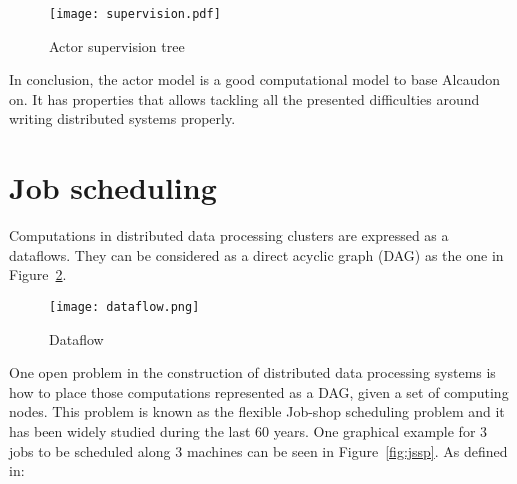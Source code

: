 \begin{figure}[!h]
\begin{center}
\texttt{[image: supervision.pdf]}
\caption{Actor supervision tree}
\label{fig:supervision}
\end{center}
\end{figure}

In conclusion, the actor model is a good computational model to base Alcaudon
on. It has properties that allows tackling all the presented difficulties around
writing distributed systems properly.

\section{Job scheduling}

Computations in distributed data processing clusters are expressed as a
dataflows. They can be considered as a direct acyclic graph (DAG) as the one in
Figure~\ref{fig:dataflow}.

\begin{figure}[h!]
\begin{center}
\texttt{[image: dataflow.png]}
\caption{Dataflow}
\label{fig:dataflow}
\end{center}
\end{figure}

One open problem in the construction of distributed data processing systems is
how to place those computations represented as a \acs{DAG}, given a set of computing
nodes. This problem is known as the flexible Job-shop scheduling problem and it
has been widely studied during the last 60 years. One graphical example for $3$
jobs to be scheduled along $3$ machines can be seen in Figure~\ref{fig:jssp}.
As defined in\cite{jobshop2}:

